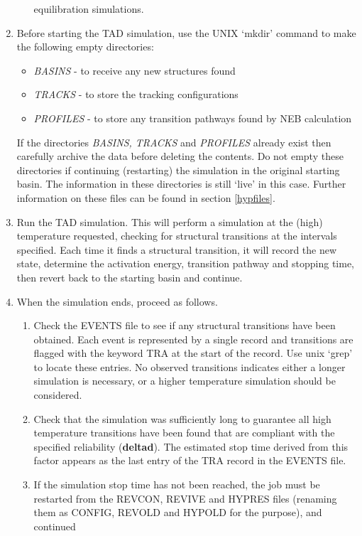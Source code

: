 \begin{enumerate}
\begin{enumerate}
  equilibration simulations.
\end{enumerate}
\item Before starting the TAD simulation, use the UNIX `mkdir' command to
   make the following empty directories: 
\begin{itemize}
   \item {\em BASINS} - to receive any new structures found
   \item {\em TRACKS} - to store the tracking configurations
   \item {\em PROFILES} - to store any transition pathways found by NEB calculation
\end{itemize}
   If the directories {\em BASINS, TRACKS} and {\em PROFILES} already
   exist then carefully archive the data before deleting the
   contents. Do not empty these directories if continuing (restarting)
   the simulation in the original starting basin. The information in
   these directories is still `live' in this case. Further information
   on these files can be found in section \ref{hypfiles}.
\item Run the TAD simulation. This will perform a simulation at the
  (high) temperature requested, checking for structural transitions at
  the intervals specified. Each time it finds a structural
  transition, it will record the new state, determine the activation
  energy, transition pathway and stopping time, then revert back to
  the starting basin and continue.
\item When the simulation ends, proceed as follows.
\begin{enumerate}
\item Check the EVENTS file to see if any structural transitions
  have been obtained. Each event is represented by a single record and
  transitions are flagged with the keyword TRA at the start of
  the record. Use unix `grep' to locate these entries. No observed
  transitions indicates either a longer simulation is necessary, or
  a higher temperature simulation should be considered.
\item Check that the simulation was sufficiently long to guarantee all
  high temperature transitions have been found that are compliant with
  the specified reliability ({\bf deltad}). The estimated stop time derived
  from this factor appears as the last entry of the TRA record in the
  EVENTS file.
\item If the simulation stop time has not been reached, the job must be
  restarted from the REVCON, REVIVE and HYPRES files (renaming them
  as CONFIG, REVOLD and HYPOLD for the purpose), and continued

\end{enumerate}
\end{enumerate}
